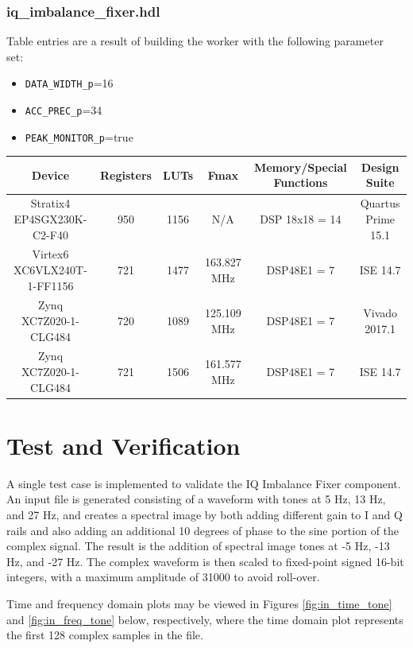 \documentclass{article}
\def\comp{iq\_imbalance\_fixer}
\begin{document}
	\subsubsection*{\comp.hdl}
	Table entries are a result of building the worker with the following parameter set:\
	\begin{itemize}
		\item \verb+DATA_WIDTH_p+=16
		\item \verb+ACC_PREC_p+=34
		\item \verb+PEAK_MONITOR_p+=true
	\end{itemize}
	\begin{scriptsize}

		\begin{tabular}{|c|c|c|c|c|c|}
			\hline
			\rowcolor{blue}
			Device                      & Registers & LUTs & Fmax        & Memory/Special Functions & Design Suite    \\
			\hline
			Stratix4 EP4SGX230K-C2-F40  & 950       & 1156 &            N/A & DSP 18x18 = 14           & Quartus Prime 15.1 \\
			\hline
			Virtex6 XC6VLX240T-1-FF1156 & 721       & 1477 & 163.827 MHz & DSP48E1 = 7              & ISE 14.7        \\
			\hline
			Zynq XC7Z020-1-CLG484       & 720       & 1089 & 125.109 MHz & DSP48E1 = 7              & Vivado 2017.1        \\
			\hline
			Zynq XC7Z020-1-CLG484       & 721       & 1506 & 161.577 MHz & DSP48E1 = 7              & ISE 14.7        \\
			\hline
		\end{tabular}
	\end{scriptsize}

	\section*{Test and Verification}
	\begin{flushleft}
	A single test case is implemented to validate the IQ Imbalance Fixer component. An input file is generated consisting of a waveform with tones at 5 Hz, 13 Hz, and 27 Hz, and creates a spectral image by both adding different gain to I and Q rails and also adding an additional 10 degrees of phase to the sine portion of the complex signal. The result is the addition of spectral image tones at -5 Hz, -13 Hz, and -27 Hz. The complex waveform is then scaled to fixed-point signed 16-bit integers, with a maximum amplitude of 31000 to avoid roll-over.\medskip

Time and frequency domain plots may be viewed in Figures \ref{fig:in_time_tone} and \ref{fig:in_freq_tone} below, respectively, where the time domain plot represents the first 128 complex samples in the file.
	\end{flushleft}
\end{document}

